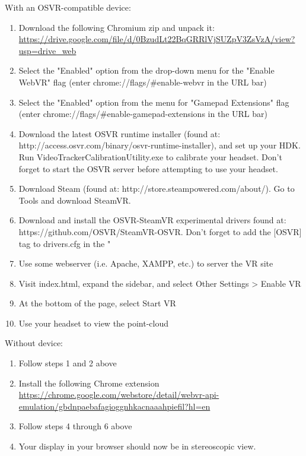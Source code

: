 \documentclass[draftclsnofoot,onecolumn]{IEEEtran}
\begin{document}
With an OSVR-compatible device:

\begin{enumerate}
    \item Download the following Chromium zip and unpack it:\\
        \url{https://drive.google.com/file/d/0BzudLt22BqGRRlVjSUZpV3ZsVzA/view?usp=drive_web}
  \item Select the "Enabled" option from the drop-down menu for the "Enable WebVR" flag (enter chrome://flags/\#enable-webvr in the URL bar)
  \item Select the "Enabled" option from the menu for "Gamepad Extensions" flag (enter chrome://flags/\#enable-gamepad-extensions in the URL bar)
  \item Download the latest OSVR runtime installer (found at: http://access.osvr.com/binary/osvr-runtime-installer), and set up your HDK. Run VideoTrackerCalibrationUtility.exe to calibrate your headset. Don't forget to start the OSVR server before attempting to use your headset.
  \item Download Steam (found at: http://store.steampowered.com/about/). Go to Tools and download SteamVR.
  \item Download and install the OSVR-SteamVR experimental drivers found at: https://github.com/OSVR/SteamVR-OSVR. Don't forget to add the [OSVR] tag to drivers.cfg in the "%
  \item Use some webserver (i.e. Apache, XAMPP, etc.) to server the VR site
  \item Visit index.html, expand the sidebar, and select Other Settings > Enable VR
  \item At the bottom of the page, select Start VR
  \item Use your headset to view the point-cloud
\end{enumerate}

Without device:

\begin{enumerate}
  \item Follow steps 1 and 2 above
  \item Install the following Chrome extension\\
      \url{https://chrome.google.com/webstore/detail/webvr-api-emulation/gbdnpaebafagioggnhkacnaaahpiefil?hl=en}
  \item Follow steps 4 through 6 above
  \item Your display in your browser should now be in stereoscopic view.
\end{enumerate}
\end{document}
